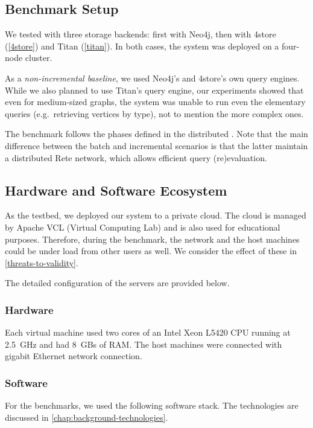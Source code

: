 \subsection{Benchmark Setup}

We tested \iqd{} with three storage backends: first with Neo4j, then with 4store (\autoref{4store}) and Titan (\autoref{titan}). In both cases, the system was deployed on a four-node cluster.

As a \emph{non-incremental baseline}, we used Neo4j's and 4store's own query engines. While we also planned to use Titan's query engine, our experiments showed that even for medium-sized graphs, the system was unable to run even the elementary queries (e.g.\ retrieving vertices by type), not to mention the more complex ones.

The benchmark follows the phases defined in the distributed \tb{}. Note that the main difference between the batch and incremental scenarios is that the latter maintain a distributed Rete network, which allows efficient query (re)evaluation.

\subsection{Hardware and Software Ecosystem}
\label{ecosystem}

As the testbed, we deployed our system to a private cloud. The cloud is managed by Apache VCL (Virtual Computing Lab) and is also used for educational purposes. Therefore, during the benchmark, the network and the host machines could be under load from other users as well. We consider the effect of these in \autoref{threats-to-validity}.

The detailed configuration of the servers are provided below.

\subsubsection{Hardware}
 
Each virtual machine used two cores of an Intel Xeon L5420 CPU running at 2.5~GHz and had 8~GBs of RAM. The host machines were connected with gigabit Ethernet network connection.

\subsubsection{Software}

For the benchmarks, we used the following software stack. The technologies are discussed in \autoref{chap:background-technologies}.

